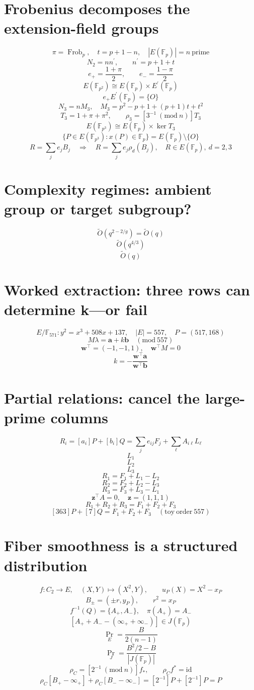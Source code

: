 \documentclass{article}
\begin{document}
\section*{Frobenius decomposes the extension-field groups}
\[
\pi=\operatorname{Frob}_p,\quad t=p+1-n,\quad |E(\mathbb{F}_p)|=n\ \mathrm{prime}
\]
\[
N_2=nn^{\prime},\qquad n^{\prime}=p+1+t
\]
\[
e_+=\frac{1+\pi}{2},\qquad e_-=\frac{1-\pi}{2}
\]
\[
E(\mathbb{F}_{p^2})\cong E(\mathbb{F}_p)\times E^{\prime}(\mathbb{F}_p)
\]
\[
e_+E^{\prime}(\mathbb{F}_p)=\{O\}
\]
\[
N_3=nM_3,\quad M_3=p^2-p+1+(p+1)t+t^2
\]
\[
T_3=1+\pi+\pi^2,\qquad \rho_3=[3^{-1}\ (\mathrm{mod}\ n)]T_3
\]
\[
E(\mathbb{F}_{p^3})\cong E(\mathbb{F}_p)\times\ker T_3
\]
\[
\{P\in E(\mathbb{F}_{p^3}):x(P)\in\mathbb{F}_p\}=E(\mathbb{F}_p)\setminus\{O\}
\]
\[
R=\sum_j e_jB_j\quad\Longrightarrow\quad R=\sum_j e_j\rho_d(B_j),\quad R\in E(\mathbb{F}_p),\ d=2,3
\]
\section*{Complexity regimes: ambient group or target subgroup?}
\[
\widetilde O(q^{2-2/g})=\widetilde O(q)
\]
\[
\widetilde O(q^{4/3})
\]
\[
\widetilde O(q)
\]
\section*{Worked extraction: three rows can determine k—or fail}
\[
E/\mathbb{F}_{571}:y^2=x^3+508x+137,\quad |E|=557,\quad P=(517,168)
\]
\[
M\lambda=\mathbf{a}+k\mathbf{b}\quad(\mathrm{mod}\ 557)
\]
\[
\mathbf{w}^{\top}=(-1,-1,1),\quad \mathbf{w}^{\top}M=0
\]
\[
k=-\frac{\mathbf{w}^{\top}\mathbf{a}}{\mathbf{w}^{\top}\mathbf{b}}
\]
\section*{Partial relations: cancel the large-prime columns}
\[
R_i=[a_i]P+[b_i]Q=\sum_j e_{ij}F_j+\sum_\ell A_{i\ell}L_\ell
\]
\[
L_1
\]
\[
L_2
\]
\[
L_3
\]
\[
R_1=F_1+L_1-L_2
\]
\[
R_2=F_2+L_2-L_3
\]
\[
R_3=F_3+L_3-L_1
\]
\[
\mathbf{z}^{\top}A=0,\quad \mathbf{z}=(1,1,1)
\]
\[
R_1+R_2+R_3=F_1+F_2+F_3
\]
\[
[363]P+[7]Q=F_1+F_2+F_3\quad(\mathrm{toy\ order}\ 557)
\]
\section*{Fiber smoothness is a structured distribution}
\[
f:C_2\longrightarrow E,\quad (X,Y)\longmapsto(X^2,Y),\qquad u_P(X)=X^2-x_P
\]
\[
B_\pm=(\pm r,y_P),\qquad r^2=x_P
\]
\[
f^{-1}(Q)=\{A_+,A_-\},\quad \pi(A_+)=A_-
\]
\[
[A_++A_- - (\infty_++\infty_-)]\in J(\mathbb{F}_p)
\]
\[
\Pr_E=\frac{B}{2(n-1)}
\]
\[
\Pr_J=\frac{B^2/2-B}{|J(\mathbb{F}_p)|}
\]
\[
\rho_C=[2^{-1}\ (\mathrm{mod}\ n)]f_*,\qquad\rho_C f^*=\mathrm{id}
\]
\[
\rho_C[B_+-\infty_+]+\rho_C[B_- -\infty_-]=[2^{-1}]P+[2^{-1}]P=P
\]
\end{document}
